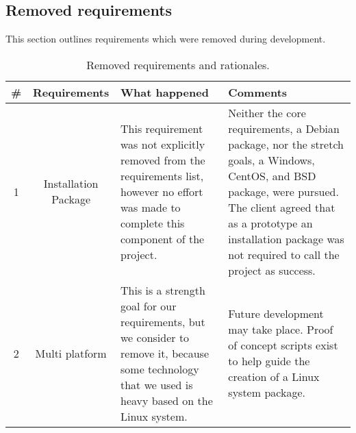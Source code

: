 \subsection{Removed requirements}

This section outlines requirements which were removed during development.

\begin{table}[H]
  \begin{center}
    \begin{tabular}{ | c | c | p{7cm} | p{6cm} | }
      \hline
      \# & Requirements & What happened & Comments \\ \hline
      1 & Installation Package &
        This requirement was not explicitly removed from the requirements list, however no effort was made to complete this component of the project. & 
        Neither the core requirements, a Debian package, nor the stretch goals, a Windows, CentOS, and BSD package, were pursued.
        The client agreed that as a prototype an installation package was not required to call the project as success. \\ \hline
      2 & Multi platform  &
        This is a strength goal for our requirements, but we consider to remove it, because some technology that we used is heavy based on the Linux system. &
        Future development may take place. Proof of concept scripts exist to help guide the creation of a Linux system package.\\ \hline
    \end{tabular}
  \end{center}
  \caption{Removed requirements and rationales.}
\end{table}
